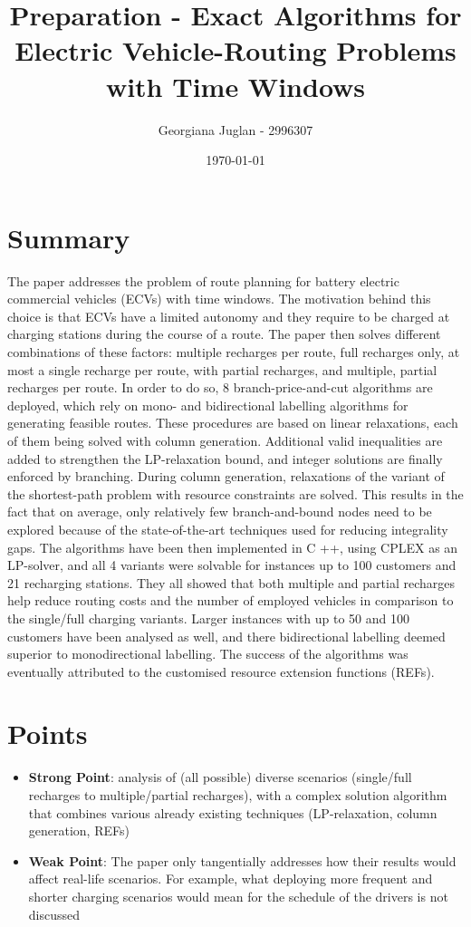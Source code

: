 \documentclass[11pt]{article}
\title{Preparation - Exact Algorithms for Electric Vehicle-Routing Problems with Time Windows}
\author{Georgiana Juglan - 2996307}
\date{\today}
\begin{document}
\maketitle

\section{Summary}
The paper addresses the problem of route planning for battery electric commercial vehicles (ECVs) with time windows. The motivation behind this choice is that ECVs have a limited autonomy and they require to be charged at charging stations during the course of a route. The paper then solves different combinations of these factors: multiple recharges per route, full recharges only, at most a single recharge per route, with partial recharges, and multiple, partial recharges per route. In order to do so, 8 branch-price-and-cut algorithms are deployed, which rely on mono- and bidirectional labelling algorithms for generating feasible routes. These procedures are based on linear relaxations, each of them being solved with column generation. Additional valid inequalities are added to strengthen the LP-relaxation bound, and integer solutions are finally enforced by branching. During column generation, relaxations of the variant of the shortest-path problem with resource constraints are solved. This results in the fact that on average, only relatively few branch-and-bound nodes need to be explored because of the state-of-the-art techniques used for reducing integrality gaps. The algorithms have been then implemented in C ++, using CPLEX as an LP-solver, and all 4 variants were solvable for instances up to 100 customers and 21 recharging stations. They all showed that both multiple and partial recharges help reduce routing costs and the number of employed vehicles in comparison to the single/full charging variants. Larger instances with up to 50 and 100 customers have been analysed as well, and there bidirectional labelling deemed superior to monodirectional labelling. The success of the algorithms was eventually attributed to the customised resource extension functions (REFs).

\section{Points}
    \begin{itemize}
        \item \textbf{Strong Point}: analysis of (all possible) diverse scenarios (single/full recharges to multiple/partial recharges), with a complex solution algorithm that combines various already existing techniques (LP-relaxation, column generation, REFs)
        \item \textbf{Weak Point}: The paper only tangentially addresses how their results would affect real-life scenarios. For example, what deploying more frequent and shorter charging scenarios would mean for the schedule of the drivers is not discussed
    \end{itemize}
\end{document}
